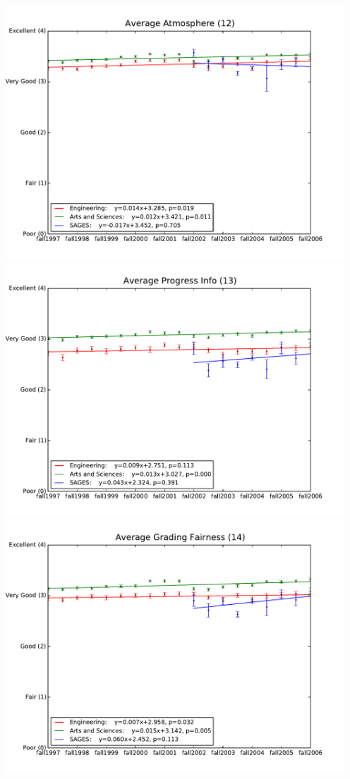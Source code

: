 \documentclass[12pt]{article}
\begin{document}
\begin{center}
    \includegraphics[width=5in]{figures/12_atmosphere_over_time.pdf} \\
    \includegraphics[width=5in]{figures/13_prog_info_over_time.pdf} \\
    \includegraphics[width=5in]{figures/14_fair_grading_over_time.pdf} \\

\end{center}
\end{document}
